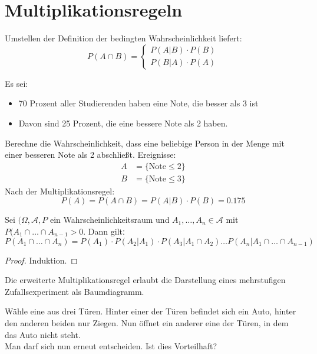 \section{Multiplikationsregeln}
Umstellen der Definition der bedingten Wahrscheinlichkeit liefert:
\[
P(A \cap B) = \begin{cases}
	P(A|B) \cdot P(B) \\
	P(B|A) \cdot P(A)
\end{cases}
\]
\begin{example}[Notenverteilung]
Es sei:
\begin{itemize}
	\item 70 Prozent aller Studierenden haben eine Note, die besser als 3 ist
	\item Davon sind 25 Prozent, die eine bessere Note als 2 haben.
\end{itemize}
Berechne die Wahrscheinlichkeit, dass eine beliebige Person in der Menge mit einer besseren Note als 2 abschließt. Ereignisse:
\begin{align*}
	A&= \{\text{Note} \le 2\} \\
	B&= \{\text{Note} \le 3\} 
\end{align*}
Nach der Multiplikationsregel:
\[
P(A)= P(A \cap B) = P(A|B) \cdot P(B) = 0.175
\]
\end{example}
\begin{theorem}
	Sei $(\Omega, \mathcal{A}, P$ ein Wahrscheinlichkeitsraum und $A_1,\ldots,A_n \in \mathcal{A}$ mit $P(A_1 \cap \ldots \cap A_{n-1}>0$. Dann giltː
	\[
		P(A_1 \cap \ldots \cap A_n) = P(A_1)\cdot P(A_2 |A_1)\cdot  P(A_3| A_1 \cap A_2) \ldots P(A_n| A_1 \cap \ldots \cap A_{n-1})
	\]
\end{theorem}
\begin{proof}
Induktion. %
\end{proof}
Die erweiterte Multiplikationsregel erlaubt die Darstellung eines mehrstufigen Zufallsexperiment als Baumdiagramm.
\begin{example}[Ziegenproblem]
	Wähle eine aus drei Türen. Hinter einer der Türen befindet sich ein Auto, hinter den anderen beiden nur Ziegen. Nun öffnet ein anderer eine der Türen, in dem das Auto nicht steht. \\
	Man darf sich nun erneut entscheiden. Ist dies Vorteilhaft?
\end{example}

